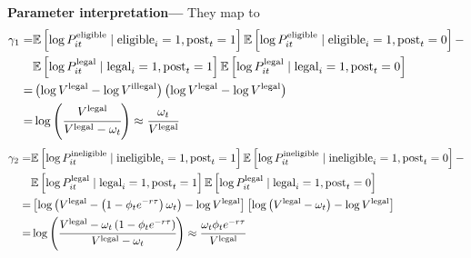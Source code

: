 \documentclass[12pt]{article}
\begin{document}
\textbf{Parameter interpretation---} They map to 
\begin{align*}
\gamma_1=&\mathbb{E}\left[\log P_{it}^{\text{eligible}}\mid \text{eligible}_i=1,\text{post}_t=1 \right]\mathbb{E}\left[\log P_{it}^{\text{eligible}}\mid \text{eligible}_i=1,\text{post}_t=0 \right]-\\ 
&\mathbb{E}\left[\log P_{it}^{\text{legal}}\mid \text{legal}_i=1,\text{post}_t=1 \right]\mathbb{E}\left[\log P_{it}^{\text{legal}}\mid \text{legal}_i=1,\text{post}_t=0 \right]\\
=&\left(\log V^{\text{legal}}-\log V^{\text{illegal}}\right)\left(\log V^{\text{legal}}-\log V^{\text{legal}}\right)\\
=&\log\left(\cfrac{V^{\text{legal}}}{V^{\text{legal}}-\omega_t}\right)\approx\cfrac{\omega_t}{V^{\text{legal}}}
\end{align*}
\begin{align*}
\gamma_2=&\mathbb{E}\left[\log P_{it}^{\text{ineligible}}\mid \text{ineligible}_i=1,\text{post}_t=1 \right]\mathbb{E}\left[\log P_{it}^{\text{ineligible}}\mid \text{ineligible}_i=1,\text{post}_t=0 \right]-\\ 
&\mathbb{E}\left[\log P_{it}^{\text{legal}}\mid \text{legal}_i=1,\text{post}_t=1 \right]\mathbb{E}\left[\log P_{it}^{\text{legal}}\mid \text{legal}_i=1,\text{post}_t=0 \right]\\
=&\left[\log\left(V^{\text{legal}}-\left(1-\phi_t e^{-r\tau}\right)\omega_t\right)-\log V^{\text{legal}}\right]\left[\log\left(V^{\text{legal}}-\omega_t\right)-\log V^{\text{legal}} \right]\\
=&\log \left(\cfrac{V^{\text{legal}}-\omega_t\left(1-\phi_t e^{-r\tau}\right)}{V^{\text{legal}}-\omega_t} \right)\approx\cfrac{\omega_t\phi_te^{-r\tau}}{V^{\text{legal}}}
\end{align*}
\end{document}
